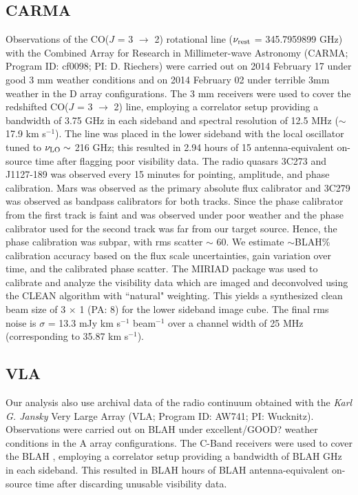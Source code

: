 \subsection{CARMA}
%
Observations of the CO($J$ = 3 $\rightarrow$ 2) rotational line ($\nu_{\rm
rest}$ = 345.7959899 GHz)
with the Combined Array for Research in Millimeter-wave
Astronomy (CARMA; Program ID: cf0098; PI: D. Riechers) were 
carried out on 2014 February 17
under good 3 mm weather
conditions and on 2014 February 02 under terrible 3mm weather in the D array
configurations. The 3 mm receivers were used to cover the
redshifted CO($J$ = 3 $\rightarrow$ 2) line, employing a correlator setup
providing a bandwidth of 3.75 GHz in each sideband and spectral resolution of
12.5 MHz ($\sim$17.9 km s$^{-1}$). The line was placed in the
lower sideband with the local oscillator tuned to $\nu_{\rm LO}\sim$ 216 GHz;
this resulted in 2.94 hours of 15 antenna-equivalent on-source time after
flagging poor visibility data.
The radio quasars 3C273 and J1127-189 was observed every 15 minutes for
pointing, amplitude, and phase calibration. Mars was observed as the
primary absolute flux calibrator and 3C279 was observed as bandpass calibrators for
both tracks.
Since the phase calibrator from the first track is faint and was observed under
poor weather and the phase calibrator used for the second track was
far from our target source.
Hence, the phase calibration was
subpar, with rms scatter $\sim$ 60\degr.
We estimate $\sim
$BLAH\% calibration accuracy based on the flux scale uncertainties, gain variation over time, and
the calibrated phase scatter.
The MIRIAD package was used to calibrate and analyze the visibility data which
are imaged and deconvolved using
the CLEAN algorithm with ``natural" weighting. This yields a synthesized clean
beam size of 3 $\times$ 1 (PA: 8\degr) for the lower sideband
image cube. The
final
rms noise is $\sigma$ = 13.3 mJy km s$^{-1}$ beam$^{-1}$ over a channel width
of
25 MHz (corresponding to 35.87 km s$^{-1}$).

\subsection{VLA}
Our analysis also use archival data of the radio continuum obtained with the 
{\it Karl G. Jansky} Very Large Array (VLA; Program ID: AW741; PI: Wucknitz).
Observations were carried out on BLAH under excellent/GOOD? weather
conditions in the A array configurations. The C-Band receivers were used to
cover the BLAH , employing a correlator setup providing a bandwidth of BLAH GHz in each
sideband. This resulted in BLAH hours of BLAH antenna-equivalent on-source time
after discarding unusable visibility data.

